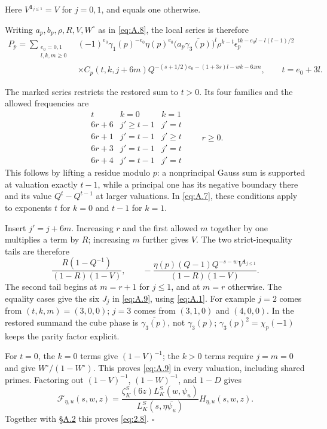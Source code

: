 \documentclass[11pt,a4paper]{article}
\begin{document}
Here \(V^{\mathbf1_{j\le1}}=V\) for \(j=0,1\), and equals one otherwise.

Writing \(a_p,b_p,\rho,R,V,W^\circ\) as in \eqref{eq:A.8}, the local series is therefore \[
\begin{aligned}
P_p=\sum_{\substack{e_0=0,1\\l,k,m\ge0}}
&(-1)^{e_0}\gamma_1(p)^{-e_0}\eta(p)^{e_0}
\bigl(a_p\overline{\gamma_3(p)}\bigr)^l
\rho^{k-t}\epsilon_p^{tk-e_0l-l(l-1)/2}\\
&\times C_p(t,k,j+6m)
Q^{-(s+1/2)e_0-(1+3s)l-wk-6zm},\qquad t=e_0+3l.
\end{aligned}
\tag{A.10}\label{eq:A.10}
\]

The marked series restricts the restored sum to \(t>0\). Its four families and the allowed frequencies are \[
\begin{array}{c|cc}
 t&k=0&k=1\\\hline
 6r+6&j'\ge t-1&j'=t\\
 6r+1&j'=t-1&j'\ge t\\
 6r+3&j'=t-1&j'=t\\
 6r+4&j'=t-1&j'=t
\end{array}\qquad r\ge0.
\tag{A.11}\label{eq:A.11}
\] This follows by lifting a residue modulo \(p\): a nonprincipal Gauss sum is supported at valuation exactly \(t-1\), while a principal one has its negative boundary there and its value \(Q^t-Q^{t-1}\) at larger valuations. In \eqref{eq:A.7}, these conditions apply to exponents \(t\) for \(k=0\) and \(t-1\) for \(k=1\).

Insert \(j'=j+6m\). Increasing \(r\) and the first allowed \(m\) together by one multiplies a term by \(R\); increasing \(m\) further gives \(V\). The two strict-inequality tails are therefore \[
 \frac{R(1-Q^{-1})}{(1-R)(1-V)},\qquad
 -\frac{\eta(p)(Q-1)Q^{-s-w}V^{\mathbf1_{j\le1}}}{(1-R)(1-V)}.
\] The second tail begins at \(m=r+1\) for \(j\le1\), and at \(m=r\) otherwise. The equality cases give the six \(J_j\) in \eqref{eq:A.9}, using \eqref{eq:A.1}. For example \(j=2\) comes from \((t,k,m)=(3,0,0)\); \(j=3\) comes from \((3,1,0)\) and \((4,0,0)\). In the restored summand the cube phase is \(\overline{\gamma_3(p)}\), not \(\gamma_3(p)\); \(\gamma_3(p)^2=\chi_p(-1)\) keeps the parity factor explicit.

For \(t=0\), the \(k=0\) terms give \((1-V)^{-1}\); the \(k>0\) terms require \(j=m=0\) and give \(W^\circ/(1-W^\circ)\). This proves \eqref{eq:A.9} in every valuation, including shared primes. Factoring out \((1-V)^{-1}\), \((1-W)^{-1}\), and \(1-D\) gives \[
 \mathcal F_{\eta,u}(s,w,z)=
 \frac{\zeta_K^S(6z)L_K^S(w,\psi_u)}{L_K^S(s,\eta\overline{\psi_u})}
 H_{\eta,u}(s,w,z).
\] Together with \hyperref[sec:A.2]{§A.2} this proves \eqref{eq:2.8}. \hfill\(\square\)
\end{document}
